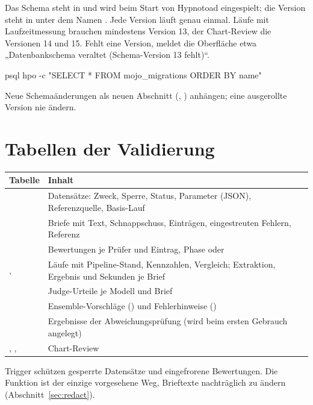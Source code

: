 \documentclass[11pt,a4paper,parskip=half-,headings=standardclasses,toc=bibliography,open=any]{scrreprt}
\begin{document}
Das Schema steht in  und wird beim Start von Hypnotoad eingespielt; die Version steht in  unter dem Namen . Jede Version läuft genau einmal. Läufe mit Laufzeitmessung brauchen mindestens Version 13, der Chart-Review die Versionen 14 und 15. Fehlt eine Version, meldet die Oberfläche etwa „Datenbankschema veraltet (Schema-Version 13 fehlt)“.

\begin{befehl}
psql hpo -c "SELECT * FROM mojo_migrations ORDER BY name"
\end{befehl}

Neue Schemaänderungen als neuen Abschnitt (, ) anhängen; eine ausgerollte Version nie ändern.

\section{Tabellen der Validierung}

\begin{tabularx}{\textwidth}{@{}P{5.2cm}L@{}}
\toprule
\textbf{Tabelle} & \textbf{Inhalt}\\
\midrule
{} & Datensätze: Zweck, Sperre, Status, Parameter (JSON), Referenzquelle, Basis-Lauf\\
 & Briefe mit Text, Schnappschuss, Einträgen, eingestreuten Fehlern, Referenz\\
 & Bewertungen je Prüfer und Eintrag, Phase  oder \\
,  & Läufe mit Pipeline-Stand, Kennzahlen, Vergleich; Extraktion, Ergebnis und Sekunden je Brief\\
 & Judge-Urteile je Modell und Brief\\
 & Ensemble-Vorschläge () und Fehlerhinweise ()\\
 & Ergebnisse der Abweichungsprüfung (wird beim ersten Gebrauch angelegt)\\
, ,  & Chart-Review\\
\bottomrule
\end{tabularx}

Trigger schützen gesperrte Datensätze und eingefrorene Bewertungen. Die Funktion  ist der einzige vorgesehene Weg, Brieftexte nachträglich zu ändern (Abschnitt~\ref{sec:redact}).
\end{document}
